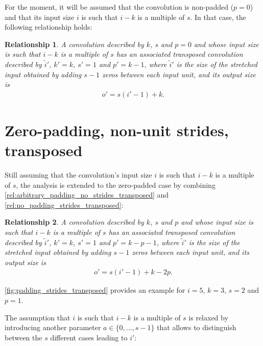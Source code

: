 \documentclass{report}
\newtheorem{relationship}{Relationship}
\begin{document}
For the moment, it will be assumed that the convolution is non-padded ($p = 0$)
and that its input size $i$ is such that $i - k$ is a multiple of $s$. In that
case, the following relationship holds:

\begin{relationship}\label{rel:no_padding_strides_transposed}
A convolution described by $k$, $s$ and $p = 0$ and whose input size is such
that $i - k$ is a multiple of $s$ has an associated transposed convolution
described by $\tilde{i}'$, $k' = k$, $s' = 1$ and $p' = k - 1$, where
$\tilde{i}'$ is the size of the stretched input obtained by adding $s - 1$ zeros
between each input unit, and its output size is
\begin{equation*}
\begin{split}
    o' = s (i' - 1) + k.
\end{split}
\end{equation*}
\end{relationship}

\section{Zero-padding, non-unit strides, transposed}

Still assuming that the convolution's input size $i$ is such that $i - k$ is a
multiple of $s$, the analysis is extended to the zero-padded case by combining
\autoref{rel:arbitrary_padding_no_strides_transposed} and
\autoref{rel:no_padding_strides_transposed}:

\begin{relationship}\label{rel:padding_strides_transposed}
A convolution described by $k$, $s$ and $p$ and whose input size is such
that $i - k$ is a multiple of $s$ has an associated transposed convolution
described by $\tilde{i}'$, $k' = k$, $s' = 1$ and $p' = k - p - 1$, where
$\tilde{i}'$ is the size of the stretched input obtained by adding $s - 1$ zeros
between each input unit, and its output size is
\begin{equation*}
\begin{split}
    o' = s (i' - 1) + k - 2p.
\end{split}
\end{equation*}
\end{relationship}

\autoref{fig:padding_strides_transposed} provides an example for $i = 5$, $k =
3$, $s = 2$ and $p = 1$.

The assumption that $i$ is such that $i - k$ is a multiple of $s$ is relaxed by
introducing another parameter $a \in \{0, \ldots, s - 1\}$ that allows to
distinguish between the $s$ different cases leading to $i'$:
\end{document}
